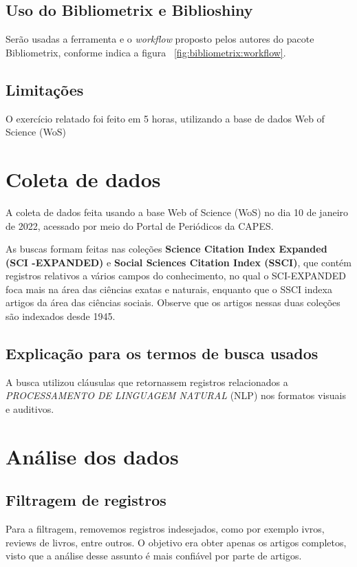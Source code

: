 \subsection{Uso do Bibliometrix e Biblioshiny}
Serão usadas a ferramenta e o \textit{workflow} proposto pelos autores do pacote Bibliometrix, conforme indica a figura ~\ref{fig:bibliometrix:workflow}.

\subsection{Limitações} O exercício relatado foi feito em 5 horas, utilizando a base de dados Web of Science (WoS)


\section{Coleta de dados\label{MASSA:coleta}}

A coleta de dados feita usando a base Web of Science (WoS) no dia 10 de janeiro de 2022, acessado por meio do Portal de Periódicos da CAPES.

As buscas formam feitas nas coleções \textbf{Science  Citation  Index  Expanded (SCI -EXPANDED)} e \textbf{Social  Sciences  Citation  Index (SSCI)}, que contém registros relativos a vários campos do conhecimento, no qual o SCI-EXPANDED foca mais na área das ciências exatas e naturais, enquanto que o SSCI indexa artigos da área das ciências sociais. Observe que os artigos nessas duas coleções são indexados desde 1945. 


\subsection{Explicação para os termos de busca usados\label{}}

A busca utilizou cláusulas que retornassem registros relacionados a \textit{PROCESSAMENTO DE LINGUAGEM NATURAL} (NLP) nos formatos visuais e auditivos.

\section{Análise dos dados}

\subsection{Filtragem de registros}

Para a filtragem, removemos registros indesejados, como por exemplo ivros, reviews de livros, entre outros. O objetivo era obter apenas os artigos completos, visto que a análise desse assunto é mais confiável por parte de artigos.

